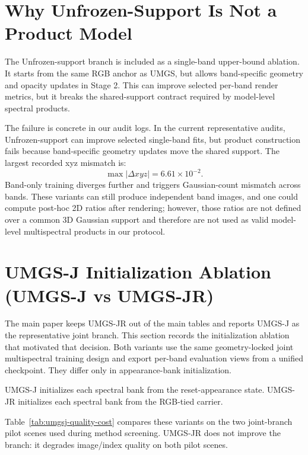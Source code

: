 ﻿\documentclass[acmtog,anonymous,review]{acmart}
\begin{document}
\section{Why Unfrozen-Support Is Not a Product Model}

The Unfrozen-support branch is included as a single-band upper-bound ablation. It starts from the same RGB anchor as UMGS, but allows band-specific geometry and opacity updates in Stage 2. This can improve selected per-band render metrics, but it breaks the shared-support contract required by model-level spectral products.

The failure is concrete in our audit logs. In the current representative audits, Unfrozen-support can improve selected single-band fits, but product construction fails because band-specific geometry updates move the shared support. The largest recorded xyz mismatch is:
\[
\max |\Delta xyz| = 6.61\times 10^{-2}.
\]
Band-only training diverges further and triggers Gaussian-count mismatch across bands. These variants can still produce independent band images, and one could compute post-hoc 2D ratios after rendering; however, those ratios are not defined over a common 3D Gaussian support and therefore are not used as valid model-level multispectral products in our protocol.


\FloatBarrier

\section{UMGS-J Initialization Ablation (UMGS-J vs UMGS-JR)}

The main paper keeps UMGS-JR out of the main tables and reports UMGS-J as the representative joint branch. This section records the initialization ablation that motivated that decision. Both variants use the same geometry-locked joint multispectral training design and export per-band evaluation views from a unified checkpoint. They differ only in appearance-bank initialization.

UMGS-J initializes each spectral bank from the reset-appearance state. UMGS-JR initializes each spectral bank from the RGB-tied carrier.

Table~\ref{tab:umgsj-quality-cost} compares these variants on the two joint-branch pilot scenes used during method screening. UMGS-JR does not improve the branch: it degrades image/index quality on both pilot scenes.
\end{document}
